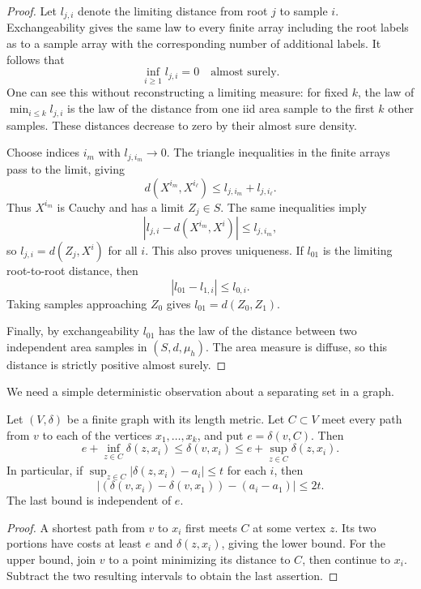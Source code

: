 \begin{proof}
Let \(l_{j,i}\) denote the limiting distance from root \(j\)
to sample \(i\).  Exchangeability gives the same law to every
finite array including the root labels as to a sample array
with the corresponding number of additional labels.
It follows that
\begin{equation}
                       \inf_{i\ge1}l_{j,i}=0
                       \quad\text{almost surely}.
 \label{finite:root-near-sample}
\end{equation}
One can see this without reconstructing a limiting measure:
for fixed \(k\), the law of
\(\min_{i\le k}l_{j,i}\) is the law of the distance from one
iid area sample to the first \(k\) other samples.  These
distances decrease to zero by their almost sure density.

Choose indices \(i_m\) with \(l_{j,i_m}\to0\).  The triangle
inequalities in the finite arrays pass to the limit, giving
\[
 d(X^{i_m},X^{i_\ell})\le l_{j,i_m}+l_{j,i_\ell}.
\]
Thus \(X^{i_m}\) is Cauchy and has a limit \(Z_j\in S\).
The same inequalities imply
\[
 |l_{j,i}-d(X^{i_m},X^i)|\le l_{j,i_m},
\]
so \(l_{j,i}=d(Z_j,X^i)\) for all \(i\).
This also proves uniqueness.  If \(l_{01}\) is the limiting
root-to-root distance, then
\[
                       |l_{01}-l_{1,i}|\le l_{0,i}.
\]
Taking samples approaching \(Z_0\) gives
\(l_{01}=d(Z_0,Z_1)\).

Finally, by exchangeability \(l_{01}\) has the law of the
distance between two independent area samples in
\((S,d,\mu_h)\).  The area measure is diffuse, so this distance
is strictly positive almost surely.
\end{proof}

We need a simple deterministic observation about a separating
set in a graph.
\begin{lemma}
\label{finite:profile}
Let \((V,\delta)\) be a finite graph with its length metric.
Let \(C\subset V\) meet every path from \(v\) to each of the
vertices \(x_1,\ldots,x_k\), and put
\(e=\delta(v,C)\).  Then
\[
 e+\inf_{z\in C}\delta(z,x_i)
 \le \delta(v,x_i)
 \le e+\sup_{z\in C}\delta(z,x_i).
\]
In particular, if
\(\sup_{z\in C}|\delta(z,x_i)-a_i|\le t\) for each \(i\), then
\[
 |(\delta(v,x_i)-\delta(v,x_1))-(a_i-a_1)|\le2t .
\]
The last bound is independent of \(e\).
\end{lemma}

\begin{proof}
A shortest path from \(v\) to \(x_i\) first meets \(C\) at
some vertex \(z\).  Its two portions have costs at least
\(e\) and \(\delta(z,x_i)\), giving the lower bound.
For the upper bound, join \(v\) to a point minimizing its
distance to \(C\), then continue to \(x_i\).  Subtract the
two resulting intervals to obtain the last assertion.
\end{proof}

